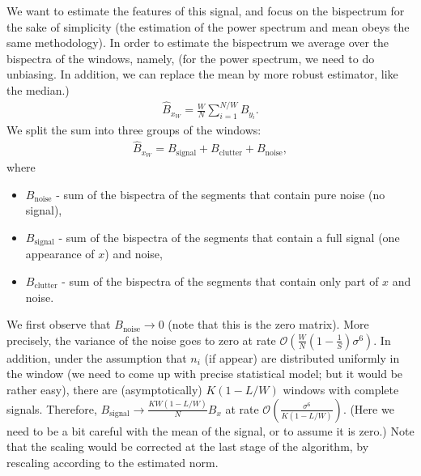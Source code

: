 \documentclass[12pt,a4paper]{article}
\numberwithin{equation}{section}
\numberwithin{figure}{section}
\theoremstyle{plain}
\theoremstyle{definition}
\theoremstyle{remark}
\theoremstyle{plain}
\theoremstyle{remark}
\theoremstyle{plain}
\theoremstyle{plain}
\newcommand{\order}[1]{\mathcal{O}\left({#1} \right)}
\begin{document}
We want to estimate the features of this signal, and focus on the bispectrum for the sake of simplicity (the estimation of the power spectrum and mean obeys the same methodology). 
In order to estimate the bispectrum we average over the bispectra of the windows, namely, (for the power spectrum, we need to do unbiasing. In addition, we can replace the mean by more robust estimator, like the median.)
\begin{eqnarray}
\hat{B}_{x_W} = \frac{W}{N}\sum_{i=1}^{N/W}B_{y_i}.
\end{eqnarray}
We split the sum into three groups of the windows:
\begin{eqnarray}
\hat{B}_{x_W} = B_\textrm{signal} + B_\textrm{clutter} + B_\textrm{noise}, 
\end{eqnarray}
where
\begin{itemize}
	\item $B_\textrm{noise}$ - sum of the bispectra of the segments that contain pure noise (no signal),
	\item $B_\textrm{signal}$ - sum of the bispectra of the segments that contain a full signal (one appearance of $x$) and noise,
	\item $B_\textrm{clutter}$ - sum of the bispectra of the segments that contain only part of $x$ and noise.
\end{itemize}

We first observe that $B_\textrm{noise}\to 0$ (note that this is the zero matrix). More precisely, the variance of the noise goes to zero at rate  $\order{\frac{W}{N}\left(1-\frac{1}{S}\right)\sigma^6}$. In addition, under the assumption that $n_i$ (if appear) are distributed uniformly in the window (we need to come up with precise statistical model; but it would be rather easy), there are (asymptotically) $K(1-L/W)$ windows with complete signals. Therefore,
$B_\textrm{signal}\to \frac{KW(1-L/W)}{N}B_x$ at rate $\order{\frac{\sigma^6}{K(1-L/W)}}$. (Here we need to be a bit careful with the mean of the signal, or to assume it is zero.) Note that the scaling would be corrected at the last stage of the algorithm, by rescaling according to the estimated  norm.
\end{document}

